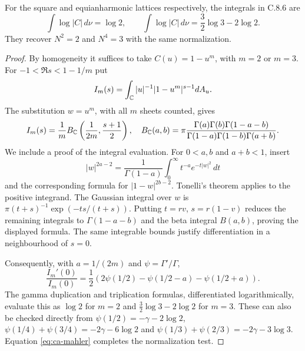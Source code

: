 \begin{statement}
For the square and equianharmonic lattices respectively, the
integrals in C.8.6 are
\[
 \int\log|C|\,d\nu=\log2,\qquad
 \int\log|C|\,d\nu=\frac32\log3-2\log2.
\]
They recover $N^2=2$ and $N^4=3$ with the same normalization.
\end{statement}
\begin{proof}
By homogeneity it suffices to take $C(u)=1-u^m$, with $m=2$
or $m=3$. For $-1<\Re s<1-1/m$ put
\[
 I_m(s)=\int_{\mathbb C} |u|^{-1}|1-u^m|^{s-1}dA_u.
\]
The substitution $w=u^m$, with all $m$ sheets counted, gives
\[
 I_m(s)=\frac1m B_{\mathbb C}\left(\frac1{2m},\frac{s+1}2\right),
 \quad
 B_{\mathbb C}(a,b)=\pi\frac{\Gamma(a)\Gamma(b)\Gamma(1-a-b)}
                   {\Gamma(1-a)\Gamma(1-b)\Gamma(a+b)}.
\]
We include a proof of the integral evaluation. For
$0<a,b$ and $a+b<1$, insert
\[
 |w|^{2a-2}=\frac1{\Gamma(1-a)}
       \int_0^\infty t^{-a}e^{-t|w|^2}\,dt
\]
and the corresponding formula for $|1-w|^{2b-2}$.
Tonelli's theorem applies to the positive integrand. The
Gaussian integral over $w$ is
$\pi(t+s)^{-1}\exp(-ts/(t+s))$.
Putting $t=rv$, $s=r(1-v)$ reduces the remaining integrals
to $\Gamma(1-a-b)$ and the beta integral $B(a,b)$, proving
the displayed formula. The same integrable bounds justify
differentiation in a neighbourhood of $s=0$.

Consequently, with $a=1/(2m)$ and $\psi=\Gamma'/\Gamma$,
\[
 \frac{I_m'(0)}{I_m(0)}
 =\frac12\left(2\psi(1/2)-\psi(1/2-a)-\psi(1/2+a)\right).
\]
The gamma duplication and triplication formulas, differentiated
logarithmically, evaluate this as $\log2$ for $m=2$ and
$\frac32\log3-2\log2$ for $m=3$. These can also be checked
directly from
$\psi(1/2)=-\gamma-2\log2$,
$\psi(1/4)+\psi(3/4)=-2\gamma-6\log2$ and
$\psi(1/3)+\psi(2/3)=-2\gamma-3\log3$.
Equation \eqref{eq:ca-mahler} completes the normalization test.
\end{proof}

